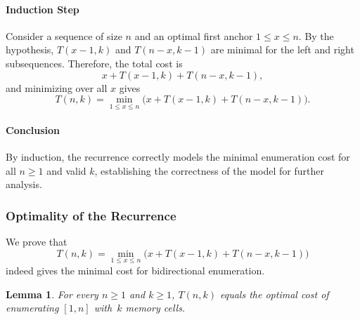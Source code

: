 \documentclass[a4paper,10pt]{article}
\newtheorem{lemma}{Lemma}
\begin{document}
\paragraph*{Induction Step}  
Consider a sequence of size \(n\) and an optimal first anchor \(1 \le x \le n\). By the hypothesis, \(T(x-1, k)\) and \(T(n-x, k-1)\) are minimal for the left and right subsequences. Therefore, the total cost is
\[
x + T(x-1, k) + T(n-x, k-1),
\]
and minimizing over all \(x\) gives
\[
T(n, k) = \min_{1 \le x \le n} \bigl( x + T(x-1, k) + T(n-x, k-1) \bigr).
\]

\paragraph*{Conclusion}  
By induction, the recurrence correctly models the minimal enumeration cost for all \(n \ge 1\) and valid \(k\), establishing the correctness of the model for further analysis.

\subsubsection*{Optimality of the Recurrence}

We prove that
\[
T(n,k)=\min_{1 \le x \le n} \bigl( x + T(x-1,k) + T(n-x,k-1) \bigr)
\]
indeed gives the minimal cost for bidirectional enumeration.

\begin{lemma}
For every $n \ge 1$ and $k \ge 1$, $T(n,k)$ equals the optimal cost of enumerating $[1,n]$ with~$k$ memory cells.
\end{lemma}
\end{document}
